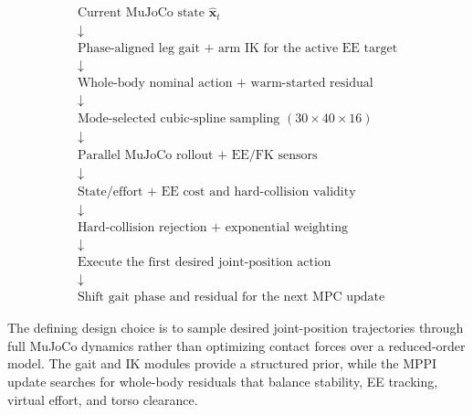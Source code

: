 \documentclass[11pt,a4paper]{article}
\begin{document}
\begin{equation*}
\boxed{
\begin{array}{c}
\text{Current MuJoCo state }\hat{\bm{x}}_t\\
\downarrow\\
\text{Phase-aligned leg gait + arm IK for the active EE target}\\
\downarrow\\
\text{Whole-body nominal action + warm-started residual}\\
\downarrow\\
\text{Mode-selected cubic-spline sampling }(30\times40\times16)\\
\downarrow\\
\text{Parallel MuJoCo rollout + EE/FK sensors}\\
\downarrow\\
\text{State/effort + EE cost and hard-collision validity}\\
\downarrow\\
\text{Hard-collision rejection + exponential weighting}\\
\downarrow\\
\text{Execute the first desired joint-position action}\\
\downarrow\\
\text{Shift gait phase and residual for the next MPC update}
\end{array}}
\end{equation*}

The defining design choice is to sample desired joint-position trajectories
through full MuJoCo dynamics rather than optimizing contact forces over a
reduced-order model. The gait and IK modules provide a structured prior, while
the MPPI update searches for whole-body residuals that balance stability, EE
tracking, virtual effort, and torso clearance.
\end{document}
